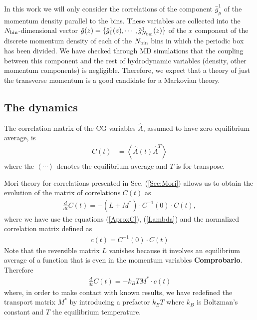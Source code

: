 \documentclass[a4paper,openright,12pt]{book}
\newcommand{\esc}{\!\cdot\!}
\newcommand{\Note}[1]{{\bf \color{red}#1}}    %
\newcommand{\llangle}{\left\langle}
\newcommand{\rrangle}{\right\rangle}
\begin{document}
In this work we  will only  consider the correlations  of the
component  $\hat{g}^1_\mu$ of  the  momentum density  parallel to  the
bins. These variables are collected into the $N_{\rm bin}$-dimensional
vector           $\hat{g}(z)=\{\hat{g}^1_1(z),\cdots,\hat{g}^1_{N_{\rm
    bin}}(z)\}$ of the $x$ component  of the discrete momentum density
of each of the ${N_{\rm bin}}$ bins in which the periodic box has been
divided.  We  have checked  through MD  simulations that  the coupling
between  this  component  and   the  rest  of  hydrodynamic  variables
(density,  other momentum  components) is  negligible.  Therefore,  we
expect  that a  theory  of  just the  transverse  momentum  is a  good
candidate for  a Markovian theory.  

\subsection{The dynamics}
\label{Sec:Trans}
The correlation matrix of the  CG variables $\hat{A}$, assumed to have zero
equilibrium average, is 
\begin{align}
  C(t)&=\llangle \hat{A}(t)\hat{A}^T\rrangle
\end{align}
where the $\llangle\cdots\rrangle$ denotes the equilibrium average and
$T$ is for transpose. 

Mori theory for correlations presented in Sec. (\ref{Sec:Mori}) allows us to obtain the evolution of the matrix of correlations $C(t)$ as
\begin{align}
    \frac{d}{dt}C(t) = -(L+M^*)\cdot C^{-1}(0)\cdot C(t),
\end{align}
where we have use the equations (\ref{AproxC}), (\ref{Lambda}) and the normalized correlation matrix defined as
\begin{align}
  c(t)=C^{-1}(0)\esc C(t)
\end{align}
Note that the reversible matrix $L$ vanishes because it involves an equilibrium average of a function that is even in the momentum variables \Note{Comprobarlo}. Therefore
\begin{align}
    \frac{d}{dt}C(t) = -k_BTM^*\cdot c(t)
    \label{AproxCg}
\end{align}
where, in order to make contact  with known results, we have redefined
the transport  matrix $M^*$  by introducing  a prefactor  $k_BT$ where
$k_B$ is Boltzman's constant and $T$ the equilibrium temperature. 
\end{document}
